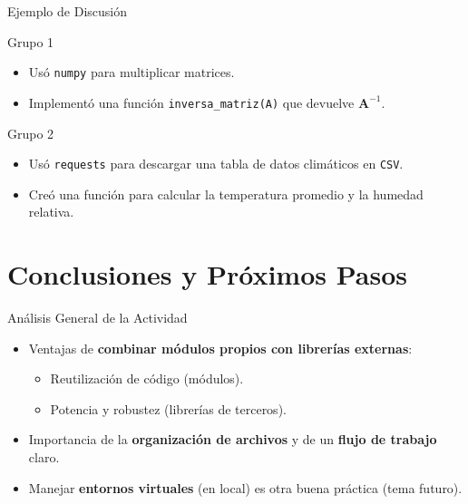 \documentclass[10pt]{beamer}
\begin{document}
\begin{frame}{Ejemplo de Discusión}
  \begin{block}{Grupo 1}
    \begin{itemize}
      \item Usó \texttt{numpy} para multiplicar matrices.
      \item Implementó una función \texttt{inversa\_matriz(A)} que devuelve \(\mathbf{A}^{-1}\).
    \end{itemize}
  \end{block}
  \vspace{0.4cm}
  \begin{block}{Grupo 2}
    \begin{itemize}
      \item Usó \texttt{requests} para descargar una tabla de datos climáticos en \texttt{CSV}.
      \item Creó una función para calcular la temperatura promedio y la humedad relativa.
    \end{itemize}
  \end{block}
\end{frame}

\section{Conclusiones y Próximos Pasos}

\begin{frame}{Análisis General de la Actividad}
  \begin{itemize}
    \item Ventajas de \textbf{combinar módulos propios con librerías externas}:
      \begin{itemize}
        \item Reutilización de código (módulos).
        \item Potencia y robustez (librerías de terceros).
      \end{itemize}
    \item Importancia de la \textbf{organización de archivos} y de un \textbf{flujo de trabajo} claro.
    \item Manejar \textbf{entornos virtuales} (en local) es otra buena práctica (tema futuro).
  \end{itemize}
\end{frame}
\end{document}
